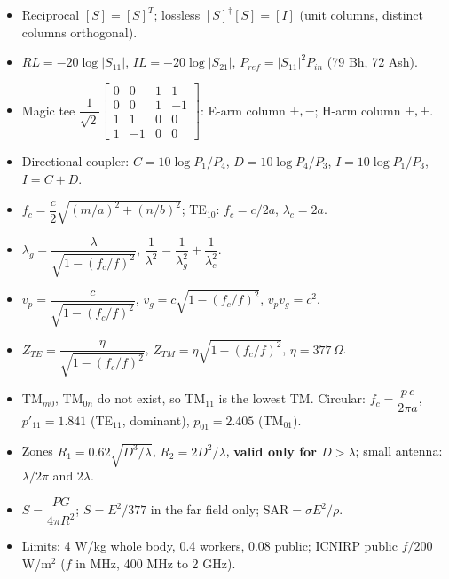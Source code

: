 \begin{itemize}[leftmargin=12pt, itemsep=0.5pt, topsep=1pt]
  \item Reciprocal $[S] = [S]^T$; lossless $[S]^\dagger[S] = [I]$ (unit columns, distinct
    columns orthogonal).
  \item $RL = -20\log|S_{11}|$, $IL = -20\log|S_{21}|$, $P_{ref} = |S_{11}|^2P_{in}$
    (79 Bh, 72 Ash).
  \item Magic tee $\dfrac{1}{\sqrt2}\begin{bmatrix}0&0&1&1\\0&0&1&-1\\1&1&0&0\\1&-1&0&0\end{bmatrix}$:
    E-arm column $+,-$; H-arm column $+,+$.
  \item Directional coupler: $C = 10\log P_1/P_4$, $D = 10\log P_4/P_3$,
    $I = 10\log P_1/P_3$, $\boxed{I = C + D}$.
\end{itemize}

\begin{itemize}[leftmargin=12pt, itemsep=0.5pt, topsep=1pt]
  \item $f_c = \dfrac{c}{2}\sqrt{(m/a)^2 + (n/b)^2}$; TE$_{10}$: $f_c = c/2a$, $\lambda_c = 2a$.
  \item $\lambda_g = \dfrac{\lambda}{\sqrt{1-(f_c/f)^2}}$,
    $\dfrac{1}{\lambda^2} = \dfrac{1}{\lambda_g^2} + \dfrac{1}{\lambda_c^2}$.
  \item $v_p = \dfrac{c}{\sqrt{1-(f_c/f)^2}}$, $v_g = c\sqrt{1-(f_c/f)^2}$, $v_pv_g = c^2$.
  \item $Z_{TE} = \dfrac{\eta}{\sqrt{1-(f_c/f)^2}}$, $Z_{TM} = \eta\sqrt{1-(f_c/f)^2}$,
    $\eta = 377\,\Omega$.
  \item TM$_{m0}$, TM$_{0n}$ do not exist, so TM$_{11}$ is the lowest TM. Circular:
    $f_c = \dfrac{p\,c}{2\pi a}$, $p'_{11} = 1.841$ (TE$_{11}$, dominant),
    $p_{01} = 2.405$ (TM$_{01}$).
\end{itemize}

\begin{itemize}[leftmargin=12pt, itemsep=0.5pt, topsep=1pt]
  \item Zones $R_1 = 0.62\sqrt{D^3/\lambda}$, $R_2 = 2D^2/\lambda$, \textbf{valid only for
    $D > \lambda$}; small antenna: $\lambda/2\pi$ and $2\lambda$.
  \item $S = \dfrac{PG}{4\pi R^2}$; $S = E^2/377$ in the far field only;
    $\mathrm{SAR} = \sigma E^2/\rho$.
  \item Limits: 4 W/kg whole body, 0.4 workers, 0.08 public; ICNIRP public $f/200$ W/m$^2$
    ($f$ in MHz, 400 MHz to 2 GHz).
\end{itemize}

